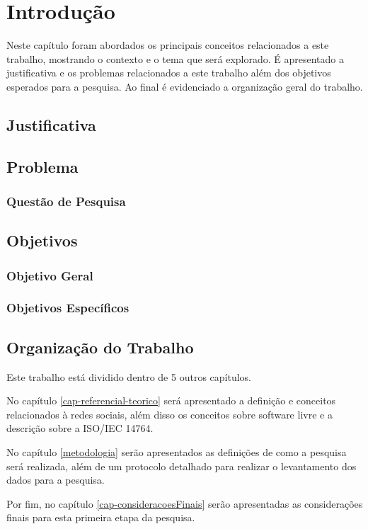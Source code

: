 \chapter{Introdução}
\label{cap-introducao}
Neste capítulo foram abordados os principais conceitos relacionados a este trabalho, mostrando o contexto e o tema que será explorado. É apresentado a justificativa e os problemas relacionados a este trabalho além dos objetivos esperados para a pesquisa. Ao final é evidenciado a organização geral do trabalho.

\section{Justificativa}


\section{Problema}


\subsection{Questão de Pesquisa}

 
\section{Objetivos}

\subsection{Objetivo Geral}

\subsection{Objetivos Específicos}


\section{Organização do Trabalho}

Este trabalho está dividido dentro de 5 outros capítulos. 

No capítulo \ref{cap-referencial-teorico} será apresentado a definição e conceitos relacionados à redes sociais, além disso os conceitos sobre software livre e a descrição sobre a ISO/IEC 14764.

No capítulo \ref{metodologia} serão apresentados as definições de como a pesquisa será realizada, além de um protocolo detalhado para realizar o levantamento dos dados para a pesquisa.

Por fim, no capítulo \ref{cap-consideracoesFinais} serão apresentadas as considerações finais para esta primeira etapa da pesquisa.